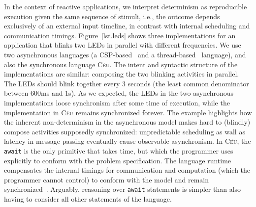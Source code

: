 \documentclass{acm_proc_article-sp}
\newcommand{\CEU}{\textsc{C\'{e}u}\xspace}
\newcommand{\code}[1] {{\small{\texttt{#1}}}}
\newcommand{\1}{\;}
\newcommand{\2}{\;\;}
\newcommand{\3}{\;\;\;}
\newcommand{\5}{\;\;\;\;\;}
\begin{document}

In the context of reactive applications, we interpret determinism as 
reproducible execution given the same sequence of stimuli, i.e., the outcome 
depends exclusively of an external input timeline, in contrast with internal 
scheduling and communication timings.
%
Figure~\ref{lst.leds} shows three implementations for an application that 
blinks two LEDs in parallel with different frequencies.
We use two asynchronous languages (a CSP-based~\cite{arduino.occam} and a 
thread-based~\cite{arduino.chibios} language), and also the synchronous 
language \CEU.
%
The intent and syntactic structure of the implementations are similar:
composing the two blinking activities in parallel.
%
The LEDs should blink together every 3 seconds (the least common denominator 
between 600ms and 1s).
%
As we expected, the LEDs in the two asynchronous implementations loose 
synchronism after some time of execution, while the implementation in \CEU 
remains synchronized forever.
%
The example highlights how the inherent non-determinism in the asynchronous 
model makes hard to (blindly) compose activities supposedly synchronized: 
unpredictable scheduling as wall as latency in message-passing eventually cause 
observable asynchronism.
%
In \CEU, the \code{await} is the only primitive that takes time, but which the 
programmer uses explicitly to conform with the problem specification.
The language runtime compensates the internal timings for communication and 
computation (which the programmer cannot control) to conform with the model and 
remain synchronized~\cite{ceu.sensys13}.
%
Arguably, reasoning over \code{await} statements is simpler than also having to 
consider all other statements of the language.
\end{document}
